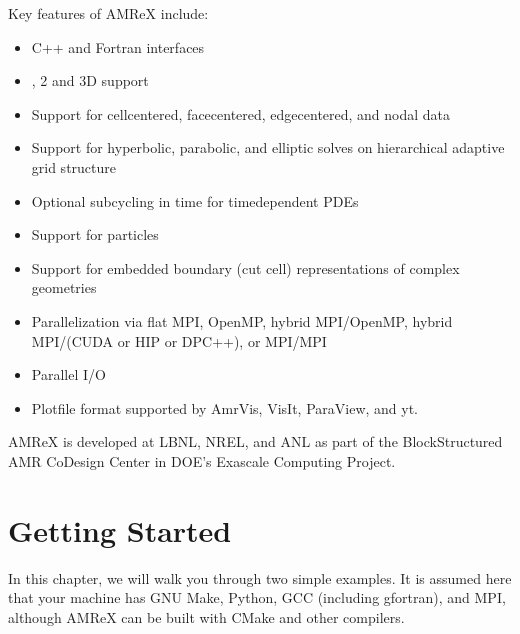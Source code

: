 \documentclass[letterpaper,10pt,english]{sphinxmanual}
\begin{document}
\sphinxAtStartPar
Key features of AMReX include:
\begin{itemize}
\item {} 
\sphinxAtStartPar
C++ and Fortran interfaces

\item {} 
\sphinxhyphen{}, 2\sphinxhyphen{} and 3\sphinxhyphen{}D support

\item {} 
\sphinxAtStartPar
Support for cell\sphinxhyphen{}centered, face\sphinxhyphen{}centered, edge\sphinxhyphen{}centered, and nodal data

\item {} 
\sphinxAtStartPar
Support for hyperbolic, parabolic, and elliptic solves on hierarchical
adaptive grid structure

\item {} 
\sphinxAtStartPar
Optional subcycling in time for time\sphinxhyphen{}dependent PDEs

\item {} 
\sphinxAtStartPar
Support for particles

\item {} 
\sphinxAtStartPar
Support for embedded boundary (cut cell) representations of complex geometries

\item {} 
\sphinxAtStartPar
Parallelization via flat MPI, OpenMP, hybrid MPI/OpenMP, hybrid
MPI/(CUDA or HIP or DPC++), or MPI/MPI

\item {} 
\sphinxAtStartPar
Parallel I/O

\item {} 
\sphinxAtStartPar
Plotfile format supported by AmrVis, VisIt, ParaView, and yt.

\end{itemize}

\sphinxAtStartPar
AMReX is developed at LBNL, NREL, and ANL as part of the Block\sphinxhyphen{}Structured AMR
Co\sphinxhyphen{}Design Center in DOE’s Exascale Computing Project.


\chapter{Getting Started}
\label{\detokenize{GettingStarted_Chapter:getting-started}}\label{\detokenize{GettingStarted_Chapter:chap-gettingstarted}}\label{\detokenize{GettingStarted_Chapter::doc}}
\sphinxAtStartPar
In this chapter, we will walk you through two simple examples. It is assumed
here that your machine has GNU Make, Python, GCC (including gfortran), and MPI,
although AMReX can be built with CMake and other compilers.
\end{document}

